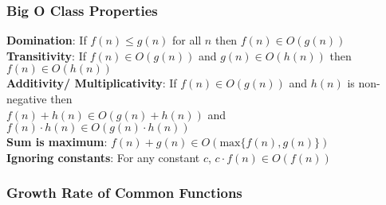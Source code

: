 \documentclass{article}
\begin{document}
\begin{spacing}{1.5}
\begin{itemize}
\end{itemize}
\subsubsection{Big O Class Properties}
\label{sec:oproperties}
\textbf{Domination}: If $f(n) \leq g(n)$ for all $n$ then $f(n) \in O(g(n))$\\
\textbf{Transitivity}: If $f(n) \in O(g(n))$ and $g(n) \in O(h(n))$ then $f(n) \in O(h(n))$\\
\textbf{Additivity/ Multiplicativity}: If $f(n) \in O(g(n))$ and $h(n)$ is non-negative then\\ $f(n)+h(n) \in O(g(n)+h(n))$ and $f(n) \cdot h(n) \in O(g(n) \cdot h(n))$\\
\textbf{Sum is maximum}: $f(n) + g(n) \in O(\text{max}\{f(n),g(n)\})$\\
\textbf{Ignoring constants}: For any constant $c$, $c \cdot f(n) \in O(f(n))$
\subsubsection{Growth Rate of Common Functions}
\label{sec:functions}

\end{spacing}
\end{document}
